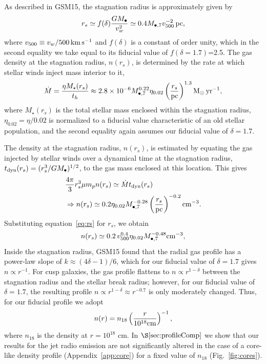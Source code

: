 \documentclass[usenatbib,fleqn]{mnras}
\newcommand{\Mbh}[1][]{M_{\bullet#1}}
\newcommand{\Msun}{{\rm M_\odot}}
\newcommand{\rs}{r_s}
\begin{document}
As described in GSM15, the stagnation radius is approximately given by
\begin{align}
r_s \simeq f(\delta) \frac{G M_{\bullet}}{v_w^2}
  \simeq 0.4 \Mbh[,7] v_{500}^{-2} \,{\rm pc},
\label{eq:rs}
\end{align}
%
where $v_{500}\equiv v_w/500 \,{\rm km\, s^{-1}}$ and $f(\delta)$ is a
constant of order unity, which in the second equality we take equal to
its fiducial value of $f(\delta = 1.7)$=2.5. The gas density at the
stagnation radius, $n(\rs)$, is determined by the rate at which
stellar winds inject mass interior to it,
\begin{equation}
  \dot{M}=\frac{\eta M_{\rm \star}(\rs)}{t_h} \approx  2.8 \times 10^{-6} \Mbh[,7]^{0.22} \eta_{0.02} \left(\frac{r_s}{\rm
      pc}\right)^{1.3} \Msun \, {\rm yr}^{-1},
\label{eq:dotM}
\end{equation}
%
where $M_{\star}(\rs)$ is the total stellar mass enclosed within the
stagnation radius, $\eta_{0.02}=\eta/0.02$ is normalized to a fiducial
value characteristic of an old stellar population, and the second
equality again assumes our fiducial value of $\delta=1.7$.

The density at the stagnation radius, $n(\rs)$, is estimated by
equating the gas injected by stellar winds over a dynamical time at
the stagnation radius, $t_{\rm dyn} (\rs)=(\rs^3/G \Mbh)^{1/2}$, to
the gas mass enclosed at this location.  This gives
\begin{align}
  &\frac{4 \pi}{3} \rs^3 \mu m_p n(r_s) \simeq \dot{M} t_{\rm dyn}
  (\rs) \nonumber\\
  &\Rightarrow n(r_s) \simeq 0.2 \eta_{0.02} \Mbh[,7]^{-0.28} \left(\frac{r_s}{\rm
      pc}\right)^{-0.2} {\rm cm}^{-3}.
\label{eq:nrs}
\end{align}
%
Substituting equation~\eqref{eq:rs} for $r_s$, we obtain 
\begin{equation}
n(r_s) \simeq 0.2 \, v_{500}^{0.4} \eta_{0.02} \Mbh[,7]^{-0.48} {\rm cm}^{-3},
\label{eq:nrs2}
\end{equation}
%
Inside the stagnation radius, GSM15 found that the radial gas profile
has a power-law slope of $k \approx (4\delta-1)/6$, which for our
fiducial value of $\delta=1.7$ gives $n \propto r^{-1}$.  For cusp
galaxies, the gas profile flattens to $n\propto r^{1-\delta}$ between
the stagnation radius and the stellar break radius; however, for our
fiducial value of $\delta = 1.7$, the resulting profile $n\propto
r^{1-\delta} \approx r^{-0.7}$ is only moderately changed.  Thus, for
our fiducial profile we adopt 
\begin{equation} n(r)= n_{18} \left(\frac{r}{10^{18}
    {\rm cm}}\right)^{-1},
\label{eq:profile}
\end{equation}
where $n_{18}$ is the density at $r = 10^{18}$ cm.  In
$\S\ref{sec:profileComp}$ we show that our results for the jet radio
emission are not significantly altered in the case of a core-like
density profile (Appendix~\ref{app:core}) for a fixed value of
$n_{18}$ (Fig.~\ref{fig:cores}).
\end{document}
